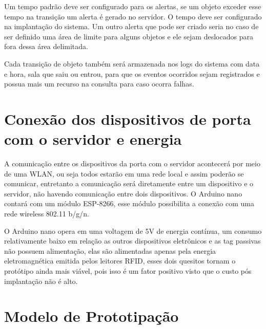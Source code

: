 \par
Um tempo padrão deve ser configurado para os alertas, se um objeto exceder esse tempo na transição um alerta é gerado no servidor.
O tempo deve ser configurado na implantação do sistema. Um outro alerta que pode ser criado seria no caso de
ser definido uma área de limite para alguns objetos e ele sejam deslocados para fora dessa área delimitada.

\par
Cada transição de objeto também será armazenada nos logs do sistema com data e hora, sala que saiu ou entrou, para que
os eventos ocorridos sejam registrados e possua mais um recurso na consulta para caso ocorra falhas.


\section{Conexão dos dispositivos de porta com o servidor e energia}
A comunicação entre os dispositivos da porta com o servidor acontecerá por meio de uma WLAN, ou seja todos estarão em uma rede
local e assim poderão se comunicar, entretanto a comunicação será diretamente entre um dispositivo e o servidor,
não havendo comunicação entre dois dispositivos. O Arduino nano contará com um módulo ESP-8266, esse módulo possibilita a
conexão com uma rede wireless 802.11 b/g/n.

\par
O Arduino nano opera em uma voltagem de 5V de energia contínua, um consumo relativamente baixo em relação as outros dispositivos eletrônicos e as tag passivas não possuem alimentação, elas são alimentadas apenas pela energia eletromagnética emitida pelos leitores RFID, esses dois quesitos tornam o protótipo ainda mais viável, pois isso é um fator positivo visto que o custo pós implantação não é alto.


\section{Modelo de Prototipação}

